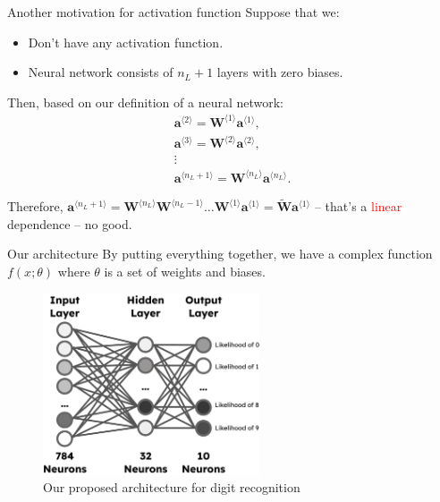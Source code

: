 \documentclass{beamer}
\begin{document}
    \begin{frame}{Another motivation for activation function}
        Suppose that we:
        \begin{itemize}
            \item Don't have any activation function.
            \item Neural network consists of $n_L+1$ layers with zero biases.
        \end{itemize}
        Then, based on our definition of a neural network:
        \begin{align*}
        \mathbf{a}^{\langle 2 \rangle} = \mathbf{W}^{\langle 1 \rangle}\mathbf{a}^{\langle 1 \rangle}, \\ \mathbf{a}^{\langle 3 \rangle} = \mathbf{W}^{\langle 2 \rangle}\mathbf{a}^{\langle 2 \rangle}, \\ \vdots \\ \mathbf{a}^{\langle n_L+1 \rangle} = \mathbf{W}^{\langle n_L \rangle}\mathbf{a}^{\langle n_L \rangle}.
        \end{align*}

        Therefore, $\mathbf{a}^{\langle n_L + 1 \rangle} = \mathbf{W}^{\langle n_L \rangle}\mathbf{W}^{\langle n_L-1 \rangle}\dots \mathbf{W}^{\langle 1 \rangle}\mathbf{a}^{\langle 1\rangle} = \widetilde{\mathbf{W}}\mathbf{a}^{\langle 1 \rangle}$ -- that's a \textcolor{red}{linear} dependence -- no good.
    \end{frame}

    \begin{frame}{Our architecture}
        By putting everything together, we have a complex function $f(x;\theta)$ where $\theta$ is a set of weights and biases.
    
        \begin{figure}
        \centering
            \includegraphics[width=0.57\textwidth]{images/presentation/our_architecture.png}
            \caption{Our proposed architecture for digit recognition}
        \end{figure}
    \end{frame}
\end{document}
